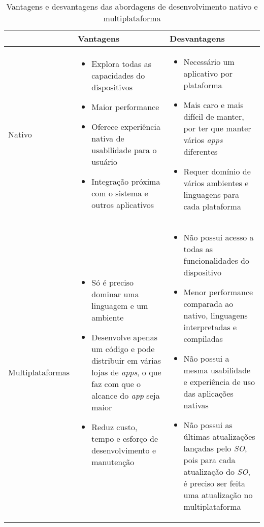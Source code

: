 \begin{table}[h]
	\centering
	{\renewcommand\arraystretch{1.25}
		\begin{tabular}{|l|l|l|} \hline
			& \multicolumn{1}{l|}{Vantagens} & \multicolumn{1}{l|}{Desvantagens}  \\ \hline\hline
			Nativo& 
			\multicolumn{1}{p{6cm}|}{\raggedright 
					\begin{itemize}
						\item Explora todas as capacidades do dispositivos
						\item Maior performance
						\item Oferece experiência nativa de usabilidade para o usuário
						\item Integração próxima com o sistema e outros aplicativos
					\end{itemize}
				} & 
			\multicolumn{1}{p{6cm}|}{\raggedright 
					\begin{itemize}
						\item Necessário um aplicativo por plataforma
						\item Mais caro e mais difícil de manter, por ter que manter vários \textit{apps} diferentes
						\item Requer domínio de vários ambientes e linguagens para cada plataforma
					\end{itemize}				
				}\\ \hline
			
			Multiplataformas& 
			\multicolumn{1}{p{6cm}|}{\raggedright 
					\begin{itemize}		
						\item Só é preciso dominar uma linguagem e um ambiente
						\item Desenvolve apenas um código e pode distribuir em várias lojas de \textit{apps}, o que faz com que o alcance do \textit{app} seja maior
						\item Reduz custo, tempo e esforço de desenvolvimento e manutenção
					\end{itemize}		
				} & 
			\multicolumn{1}{p{6cm}|}{\raggedright 
					\begin{itemize}		
						\item Não possui acesso a todas as funcionalidades do dispositivo
						\item Menor performance comparada ao nativo, linguagens interpretadas e compiladas
						\item Não possui a mesma usabilidade e experiência de uso das aplicações nativas
						\item Não possui as últimas atualizações lançadas pelo \textit{SO}, pois para cada atualização do \textit{SO}, é preciso ser feita uma atualização no multiplataforma											
					\end{itemize}												
				}\\ \hline
		\end{tabular}}
	\caption{Vantagens e desvantagens das abordagens de desenvolvimento nativo e multiplataforma }
	\label{tab:vantxdesva}
\end{table}
